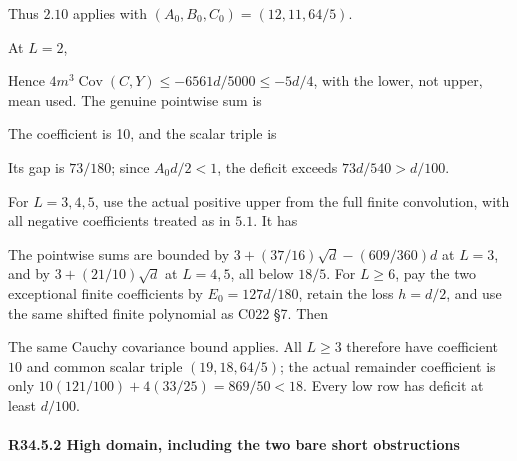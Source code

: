 
Thus \(2.10\) applies with \((A_0,\allowbreak  B_0,\allowbreak  C_0)=(12,\allowbreak  11,\allowbreak  64/5)\).

At \(L=2\),


Hence \(4m^3\operatorname{Cov}(C,\allowbreak  Y)\le-6561d/5000\le-5d/4\),
with the lower, not upper, mean used. The genuine pointwise sum is


The coefficient is 10, and the scalar triple is


Its gap is \(73/180\); since \(A_0d/2<1\), the deficit exceeds
\(73d/540>d/100\).

For \(L=3,\allowbreak  4,\allowbreak  5\), use the actual positive upper from the full finite
convolution, with all negative coefficients treated as in \(5.1\). It has


The pointwise sums are bounded by
\(3+(37/16)\sqrt d-(609/360)d\) at \(L=3\), and by
\(3+(21/10)\sqrt d\) at \(L=4,\allowbreak  5\), all below \(18/5\).
For \(L\ge6\), pay the two exceptional finite coefficients by
\(E_0=127d/180\), retain the loss \(h=d/2\), and use the same shifted
finite polynomial as C022 §7. Then


The same Cauchy covariance bound applies. All \(L\ge3\) therefore have
coefficient \(10\) and common scalar triple
\((19,\allowbreak  18,\allowbreak  64/5)\); the actual remainder coefficient is only
\(10(121/100)+4(33/25)=869/50<18\). Every low row has deficit at least
\(d/100\).

\paragraph{R34.5.2 High domain, including the two bare short obstructions}

